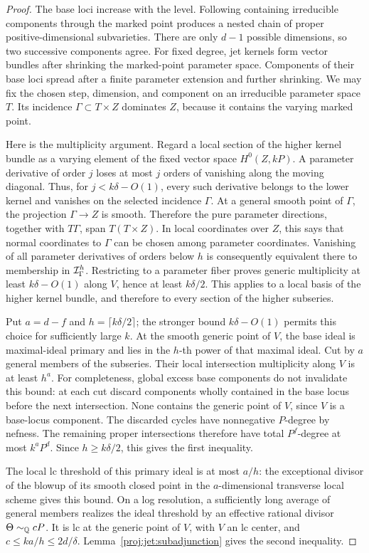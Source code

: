\begin{proof}
The base loci increase with the level.  Following containing
irreducible components through the marked point produces a nested
chain of proper positive-dimensional subvarieties.  There are only
\(d-1\) possible dimensions, so two successive components agree.
For fixed degree, jet kernels form vector bundles after shrinking
the marked-point parameter space.  Components of their base loci
spread after a finite parameter extension and further shrinking.
We may fix the chosen step, dimension, and component on an
irreducible parameter space \(T\).  Its incidence
\(\Gamma\subset T\times Z\) dominates \(Z\), because it contains the
varying marked point.

Here is the multiplicity argument.  Regard a local section of the
higher kernel bundle as a varying element of the fixed vector space
\(H^0(Z,kP)\).  A parameter derivative of order \(j\) loses at most
\(j\) orders of vanishing along the moving diagonal.  Thus, for
\(j<k\delta-O(1)\), every such derivative belongs to the lower kernel
and vanishes on the selected incidence \(\Gamma\).
At a general smooth point of \(\Gamma\), the projection
\(\Gamma\to Z\) is smooth.  Therefore the pure parameter directions,
together with \(T\Gamma\), span \(T(T\times Z)\).
In local coordinates over \(Z\), this says that normal coordinates
to \(\Gamma\) can be chosen among parameter coordinates.  Vanishing
of all parameter derivatives of orders below \(h\) is consequently
equivalent there to membership in \({\cal I}_\Gamma^h\).
Restricting to a parameter fiber proves generic multiplicity at
least \(k\delta-O(1)\) along \(V\), hence at least \(k\delta/2\).
This applies to a local basis of the higher kernel bundle, and
therefore to every section of the higher subseries.

Put \(a=d-f\) and \(h=\lceil k\delta/2\rceil\); the stronger bound
\(k\delta-O(1)\) permits this choice for sufficiently large \(k\).
At the smooth generic point of
\(V\), the base ideal is maximal-ideal primary and lies in the
\(h\)-th power of that maximal ideal.  Cut by \(a\) general members
of the subseries.  Their local intersection multiplicity along
\(V\) is at least \(h^a\).  For completeness, global excess base
components do not invalidate this bound: at each cut discard
components wholly contained in the base locus before the next
intersection.  None contains the generic point of \(V\), since
\(V\) is a base-locus component.  The discarded cycles have
nonnegative \(P\)-degree by nefness.  The remaining proper
intersections therefore have total \(P^f\)-degree at most
\(k^aP^d\).  Since \(h\ge k\delta/2\), this gives the first inequality.

The local lc threshold of this primary ideal is at most \(a/h\):
the exceptional divisor of the blowup of its smooth closed point
in the \(a\)-dimensional transverse local scheme gives this bound.
On a log resolution, a sufficiently long average of general
members realizes the ideal threshold by an effective rational
divisor \(\Theta\sim_{\mathbb{Q}}cP\).  It is lc at the generic point of
\(V\), with \(V\) an lc center, and
\(c\le k a/h\le2d/\delta\).
Lemma~\ref{proj:jet:subadjunction} gives the second inequality.
\end{proof}


